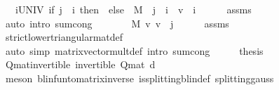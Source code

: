 \begin{isabellebody}
\ {\isachardoublequoteopen}{\isasymdots}\ {\isacharequal}{\kern0pt}\ {\isacharparenleft}{\kern0pt}{\isasymSum}i{\isasymin}UNIV{\isachardot}{\kern0pt}\ {\isacharparenleft}{\kern0pt}if\ j\ {\isasymle}\ i\ then\ {}\ else\ \ M\ {\isachardollar}{\kern0pt}\ j\ {\isachardollar}{\kern0pt}\ i\ {\isacharasterisk}{\kern0pt}\ v{\isacharprime}{\kern0pt}\ {\isachardollar}{\kern0pt}\ i{\isacharparenright}{\kern0pt}{\isacharparenright}{\kern0pt}{\isachardoublequoteclose}\isanewline
\ \ \ \ \isamarkupfalse%
\ assms\isanewline
\ \ \ \ \isamarkupfalse%
\ {\isacharparenleft}{\kern0pt}auto\ intro{\isacharbang}{\kern0pt}{\isacharcolon}{\kern0pt}\ sum{\isachardot}{\kern0pt}cong{\isacharparenright}{\kern0pt}\isanewline
\ \ \isamarkupfalse%
\ \isamarkupfalse%
\ {\isachardoublequoteopen}{\isasymdots}\ {\isacharequal}{\kern0pt}\ {\isacharparenleft}{\kern0pt}M\ {\isacharasterisk}{\kern0pt}v\ v{\isacharprime}{\kern0pt}{\isacharparenright}{\kern0pt}\ {\isachardollar}{\kern0pt}\ j{\isachardoublequoteclose}\isanewline
\ \ \ \ \isamarkupfalse%
\ assms\ \isamarkupfalse%
\ strict{\isacharunderscore}{\kern0pt}lower{\isacharunderscore}{\kern0pt}triangular{\isacharunderscore}{\kern0pt}mat{\isacharunderscore}{\kern0pt}def\isanewline
\ \ \ \ \isamarkupfalse%
\ {\isacharparenleft}{\kern0pt}auto\ simp{\isacharcolon}{\kern0pt}\ matrix{\isacharunderscore}{\kern0pt}vector{\isacharunderscore}{\kern0pt}mult{\isacharunderscore}{\kern0pt}def\ intro{\isacharbang}{\kern0pt}{\isacharcolon}{\kern0pt}\ sum{\isachardot}{\kern0pt}cong{\isacharparenright}{\kern0pt}\isanewline
\ \ \isamarkupfalse%
\ \isamarkupfalse%
\ {\isacharquery}{\kern0pt}thesis\isacommand{{\isachardot}{\kern0pt}}\isamarkupfalse%
\isanewline
{}\isamarkupfalse%
%
\endisatagproof
{\isafoldproof}%
%
\isadelimproof
\isanewline
%
\endisadelimproof
\isanewline
{}\isamarkupfalse%
\ Q{\isacharunderscore}{\kern0pt}mat{\isacharunderscore}{\kern0pt}invertible{\isacharcolon}{\kern0pt}\ {\isachardoublequoteopen}invertible\ {\isacharparenleft}{\kern0pt}Q{\isacharunderscore}{\kern0pt}mat\ d{\isacharparenright}{\kern0pt}{\isachardoublequoteclose}\isanewline
%
\isadelimproof
\ \ %
\endisadelimproof
%
\isatagproof
{}\isamarkupfalse%
\ {\isacharparenleft}{\kern0pt}meson\ blinfun{\isacharunderscore}{\kern0pt}to{\isacharunderscore}{\kern0pt}matrix{\isacharunderscore}{\kern0pt}inverse{\isacharparenleft}{\kern0pt}{}{\isacharparenright}{\kern0pt}\ is{\isacharunderscore}{\kern0pt}splitting{\isacharunderscore}{\kern0pt}blin{\isacharunderscore}{\kern0pt}def{\isacharprime}{\kern0pt}\ splitting{\isacharunderscore}{\kern0pt}gauss{\isacharparenright}{\kern0pt}%

\end{isabellebody}

